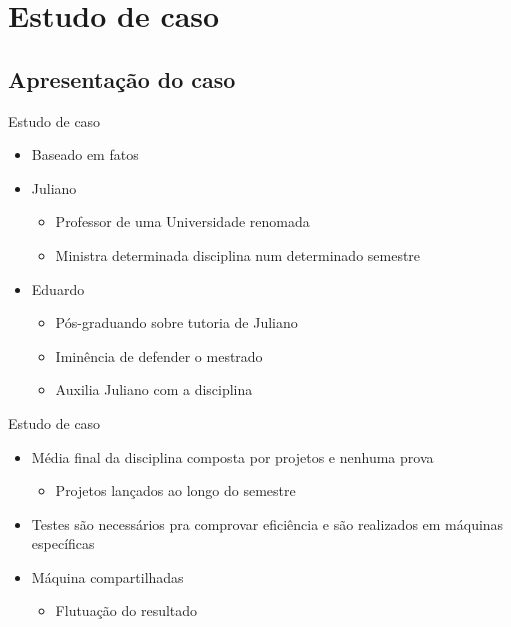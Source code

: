 \documentclass[dvipdfm]{beamer}
\begin{document}
\section{Estudo de caso}
\subsection{Apresentação do caso}
\begin{frame}{Estudo de caso}
\begin{itemize}
	\item Baseado em fatos
	\item Juliano
	\begin{itemize}
		\item Professor de uma Universidade renomada
		\item Ministra determinada disciplina num determinado semestre
	\end{itemize}
	\item Eduardo
	\begin{itemize}
		\item Pós-graduando sobre tutoria de Juliano
		\item Iminência de defender o mestrado
		\item Auxilia Juliano com a disciplina
	\end{itemize}
\end{itemize}
\end{frame}

\begin{frame}{Estudo de caso}
\begin{itemize}
	\item Média final da disciplina composta por projetos e nenhuma prova
	\begin{itemize}
		\item Projetos lançados ao longo do semestre
	\end{itemize}
	\item Testes são necessários pra comprovar eficiência e são realizados em máquinas específicas
	\item Máquina compartilhadas
	\begin{itemize}
		\item Flutuação do resultado
	\end{itemize}
\end{itemize}
\end{frame}
\end{document}
